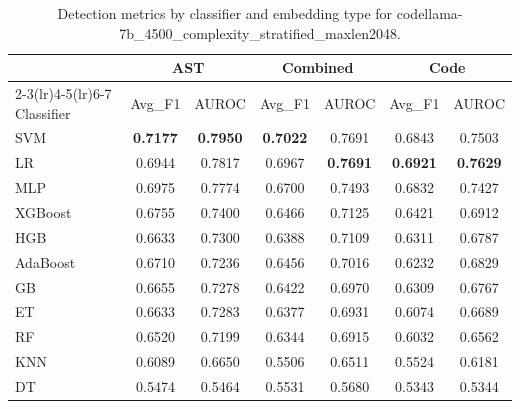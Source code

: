 \begin{table}[t]
\centering
\caption{Detection metrics by classifier and embedding type for codellama-7b\_4500\_complexity\_stratified\_maxlen2048.}
\label{tab:rq2d_codellama-7b_4500_complexity_stratified_maxlen2048}
\begin{tabular}{l cc cc cc}
\toprule
 & \multicolumn{2}{c}{AST} & \multicolumn{2}{c}{Combined} & \multicolumn{2}{c}{Code} \\
\cmidrule(lr){2-3}\cmidrule(lr){4-5}\cmidrule(lr){6-7}
Classifier & Avg\_F1 & AUROC & Avg\_F1 & AUROC & Avg\_F1 & AUROC \\
\midrule
SVM & \textbf{0.7177} & \textbf{0.7950} & \textbf{0.7022} & 0.7691 & 0.6843 & 0.7503 \\
LR & 0.6944 & 0.7817 & 0.6967 & \textbf{0.7691} & \textbf{0.6921} & \textbf{0.7629} \\
MLP & 0.6975 & 0.7774 & 0.6700 & 0.7493 & 0.6832 & 0.7427 \\
XGBoost & 0.6755 & 0.7400 & 0.6466 & 0.7125 & 0.6421 & 0.6912 \\
HGB & 0.6633 & 0.7300 & 0.6388 & 0.7109 & 0.6311 & 0.6787 \\
AdaBoost & 0.6710 & 0.7236 & 0.6456 & 0.7016 & 0.6232 & 0.6829 \\
GB & 0.6655 & 0.7278 & 0.6422 & 0.6970 & 0.6309 & 0.6767 \\
ET & 0.6633 & 0.7283 & 0.6377 & 0.6931 & 0.6074 & 0.6689 \\
RF & 0.6520 & 0.7199 & 0.6344 & 0.6915 & 0.6032 & 0.6562 \\
KNN & 0.6089 & 0.6650 & 0.5506 & 0.6511 & 0.5524 & 0.6181 \\
DT & 0.5474 & 0.5464 & 0.5531 & 0.5680 & 0.5343 & 0.5344 \\
\bottomrule
\end{tabular}
\end{table}
